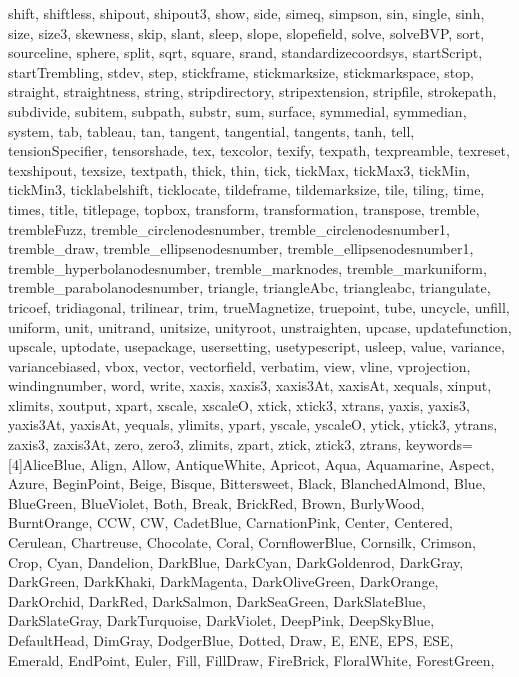 {{  shift, shiftless, shipout, shipout3, show, side, simeq, simpson, sin,
  single, sinh, size, size3, skewness, skip, slant, sleep, slope, slopefield,
  solve, solveBVP, sort, sourceline, sphere, split, sqrt, square, srand,
  standardizecoordsys, startScript, startTrembling, stdev, step, stickframe,
  stickmarksize, stickmarkspace, stop, straight, straightness, string,
  stripdirectory, stripextension, stripfile, strokepath, subdivide, subitem,
  subpath, substr, sum, surface, symmedial, symmedian, system, tab, tableau,
  tan, tangent, tangential, tangents, tanh, tell, tensionSpecifier,
  tensorshade, tex, texcolor, texify, texpath, texpreamble, texreset,
  texshipout, texsize, textpath, thick, thin, tick, tickMax, tickMax3,
  tickMin, tickMin3, ticklabelshift, ticklocate, tildeframe, tildemarksize,
  tile, tiling, time, times, title, titlepage, topbox, transform,
  transformation, transpose, tremble, trembleFuzz, tremble_circlenodesnumber,
  tremble_circlenodesnumber1, tremble_draw, tremble_ellipsenodesnumber,
  tremble_ellipsenodesnumber1, tremble_hyperbolanodesnumber,
  tremble_marknodes, tremble_markuniform, tremble_parabolanodesnumber,
  triangle, triangleAbc, triangleabc, triangulate, tricoef, tridiagonal,
  trilinear, trim, trueMagnetize, truepoint, tube, uncycle, unfill, uniform,
  unit, unitrand, unitsize, unityroot, unstraighten, upcase, updatefunction,
  upscale, uptodate, usepackage, usersetting, usetypescript, usleep, value,
  variance, variancebiased, vbox, vector, vectorfield, verbatim, view, vline,
  vprojection, windingnumber, word, write, xaxis, xaxis3, xaxis3At, xaxisAt,
  xequals, xinput, xlimits, xoutput, xpart, xscale, xscaleO, xtick, xtick3,
  xtrans, yaxis, yaxis3, yaxis3At, yaxisAt, yequals, ylimits, ypart, yscale,
  yscaleO, ytick, ytick3, ytrans, zaxis3, zaxis3At, zero, zero3, zlimits,
  zpart, ztick, ztick3, ztrans},
  keywords=[4]{AliceBlue, Align, Allow, AntiqueWhite, Apricot, Aqua,
  Aquamarine, Aspect, Azure, BeginPoint, Beige, Bisque, Bittersweet, Black,
  BlanchedAlmond, Blue, BlueGreen, BlueViolet, Both, Break, BrickRed, Brown,
  BurlyWood, BurntOrange, CCW, CW, CadetBlue, CarnationPink, Center,
  Centered, Cerulean, Chartreuse, Chocolate, Coral, CornflowerBlue, Cornsilk,
  Crimson, Crop, Cyan, Dandelion, DarkBlue, DarkCyan, DarkGoldenrod,
  DarkGray, DarkGreen, DarkKhaki, DarkMagenta, DarkOliveGreen, DarkOrange,
  DarkOrchid, DarkRed, DarkSalmon, DarkSeaGreen, DarkSlateBlue,
  DarkSlateGray, DarkTurquoise, DarkViolet, DeepPink, DeepSkyBlue,
  DefaultHead, DimGray, DodgerBlue, Dotted, Draw, E, ENE, EPS, ESE, Emerald,
  EndPoint, Euler, Fill, FillDraw, FireBrick, FloralWhite, ForestGreen,
}}
